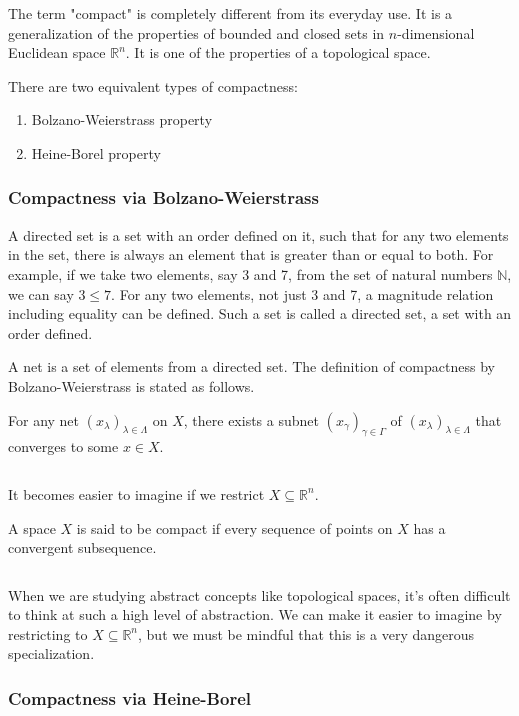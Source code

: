\documentclass[article,letterpaper,12pt]{jsarticle}
\begin{document}
The term "compact" is completely different from its everyday use.
It is a generalization of the properties of bounded and closed sets in $n$-dimensional Euclidean space $\mathbb{R}^{n}$.
It is one of the properties of a topological space.

There are two equivalent types of compactness:
\begin{enumerate}
	\item Bolzano-Weierstrass property
	\item Heine-Borel property
\end{enumerate}


\subsubsection{Compactness via Bolzano-Weierstrass}

A directed set is a set with an order defined on it, such that for any two elements in the set, there is always an element that is greater than or equal to both.
For example, if we take two elements, say 3 and 7, from the set of natural numbers $\mathbb{N}$, we can say $3 \leq 7$. For any two elements, not just 3 and 7, a magnitude relation including equality can be defined. Such a set is called a directed set, a set with an order defined.

A net is a set of elements from a directed set.
The definition of compactness by Bolzano-Weierstrass is stated as follows.

For any net $(x_{\lambda})_{\lambda \in \Lambda}$ on $X$,
there exists a subnet $(x_{\gamma})_{\gamma \in \Gamma}$ of $(x_{\lambda})_{\lambda \in \Lambda}$ that converges to some $x \in X$.

${}$

It becomes easier to imagine if we restrict $X \subseteq \mathbb{R}^{n}$.

A space $X$ is said to be compact if every sequence of points on $X$ has a convergent subsequence.

${}$

When we are studying abstract concepts like topological spaces, it's often difficult to think at such a high level of abstraction.
We can make it easier to imagine by restricting to $X \subseteq \mathbb{R}^{n}$,
but we must be mindful that this is a very dangerous specialization.


\subsubsection{Compactness via Heine-Borel}
\end{document}

